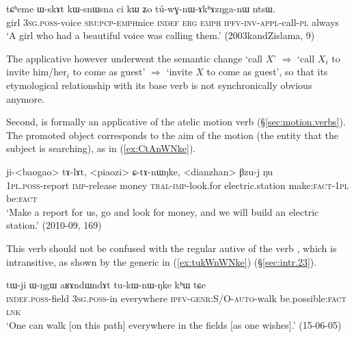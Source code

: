 \begin{exe}
\ex \label{ex:tuwGnAkhAzNganW}
\gll  tɕʰeme ɯ-skɤt kɯ-snɯ\redp{}sna ci kɯ ʑo tú-wɣ-nɯ-ɤkʰɤzŋga-nɯ ntsɯ. \\
girl \textsc{3sg}.\textsc{poss}-voice \textsc{sbj}:\textsc{pcp}-\textsc{emph}\redp{}nice \textsc{indef} \textsc{erg} \textsc{emph} \textsc{ipfv}-\textsc{inv}-\textsc{appl}-call-\textsc{pl} always \\
\glt `A girl who had a beautiful voice was calling them.' (2003kandZislama, 9)
\end{exe}

The applicative  however underwent the semantic change `call $X$' $\Rightarrow$ `call $X_i$ to invite him/her$_i$ to come as guest' $\Rightarrow$ `invite $X$ to come as guest', so that its etymological relationship with its base verb  is not synchronically obvious anymore.


Second,   is formally an applicative of the atelic motion verb  (§\ref{sec:motion.verbs}). The promoted object corresponds to the aim of the motion (the entity that the subject is searching), as in (\ref{ex:CtAnWNke}).

\begin{exe}
\ex \label{ex:CtAnWNke}
\gll   ji-<baogao> tɤ-lɤt, <piaozi> ɕ-tɤ-nɯŋke, <dianzhan> βzu-j ŋu \\
\textsc{1pl}.\textsc{poss}-report \textsc{imp}-release money \textsc{tral}-\textsc{imp}-look.for electric.station make:\textsc{fact}-\textsc{1pl} be:\textsc{fact} \\
\glt `Make a report for us, go and look for money, and we will build an electric station.' (2010-09, 169)
\end{exe}

This verb should not be confused with the regular autive  of the verb , which is intransitive, as shown by the generic  in (\ref{ex:tukWnWNke}) (§\ref{sec:intr.23}).

\begin{exe}
\ex \label{ex:tukWnWNke}
\gll tɯ-ji ɯ-ŋgɯ aʁɤndɯndɤt tu-kɯ-nɯ-ŋke kʰɯ tɕe \\
\textsc{indef}.\textsc{poss}-field \textsc{3sg}.\textsc{poss}-in everywhere \textsc{ipfv}-\textsc{genr}:S/O-\textsc{auto}-walk be.possible:\textsc{fact} \textsc{lnk} \\
\glt `One can walk [on this path] everywhere in the fields [as one wishes].' (15-06-05)
\end{exe}

